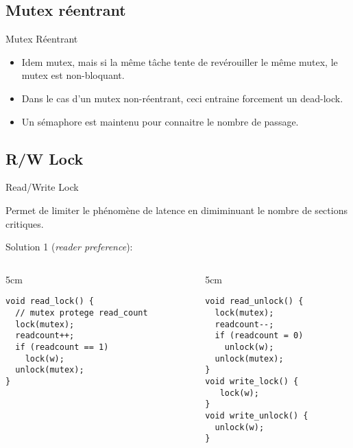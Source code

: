 \subsection{Mutex réentrant}

\begin{frame}{Mutex Réentrant}
  \begin{itemize} 
  \item Idem  mutex, mais  si la même  tâche tente de  revérouiller le
    même mutex, le mutex est non-bloquant.
  \item Dans le cas  d'un mutex non-réentrant, ceci entraine forcement
    un dead-lock.
  \item  Un sémaphore est maintenu pour connaitre le
    nombre de passage.
  \end{itemize} 
\end{frame} 

\subsection{R/W Lock}

\begin{frame}[fragile]{Read/Write Lock}

Permet de limiter le phénomène de latence en dimiminuant le nombre de sections critiques.

Solution 1 (\emph{reader preference}):
\begin{columns}
  \begin{column} {5cm}
    \begin{lstlisting} 
void read_lock() {
  // mutex protege read_count
  lock(mutex);
  readcount++;
  if (readcount == 1)
    lock(w);
  unlock(mutex);
}
    \end{lstlisting} 
  \end{column}
  \begin{column} {5cm}
    \begin{lstlisting} 
void read_unlock() {
  lock(mutex);
  readcount--;
  if (readcount = 0)
    unlock(w);
  unlock(mutex);
}
void write_lock() {
   lock(w);
}
void write_unlock() {
  unlock(w);
}
    \end{lstlisting} 
  \end{column}
\end{columns}
\end{frame} 

